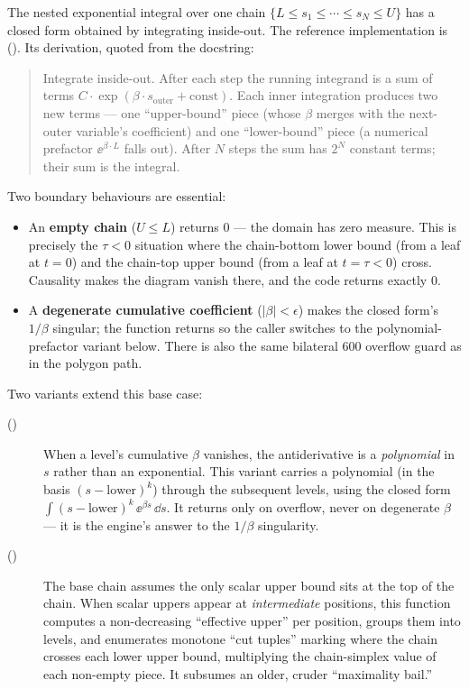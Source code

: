 The nested exponential integral over one chain
$\{L\le s_1\le\cdots\le s_N\le U\}$ has a closed form obtained by integrating
inside-out. The reference implementation is 
(). Its derivation, quoted from the docstring:

\begin{quote}\small
Integrate inside-out. After each step the running integrand is a sum of terms
$C\cdot\exp(\beta\cdot s_{\text{outer}} + \text{const})$. Each inner integration
produces two new terms --- one ``upper-bound'' piece (whose $\beta$ merges with the
next-outer variable's coefficient) and one ``lower-bound'' piece (a numerical
prefactor $\ee^{\beta\cdot L}$ falls out). After $N$ steps the sum has $2^N$
constant terms; their sum is the integral.
\end{quote}

\noindent Two boundary behaviours are essential:

\begin{itemize}
  \item An \textbf{empty chain} ($U \le L$) returns $0$ --- the domain has zero
        measure. This is precisely the $\tau < 0$ situation where the chain-bottom
        lower bound (from a leaf at $t=0$) and the chain-top upper bound (from a
        leaf at $t=\tau<0$) cross. Causality makes the diagram vanish there, and
        the code returns exactly $0$.
  \item A \textbf{degenerate cumulative coefficient} ($|\beta| < \epsilon$) makes
        the closed form's $1/\beta$ singular; the function returns  so
        the caller switches to the polynomial-prefactor variant below. There is
        also the same bilateral $600$ overflow guard as in the polygon path.
\end{itemize}

Two variants extend this base case:

\begin{description}
  \item[
        ()] When a level's cumulative $\beta$
        vanishes, the antiderivative is a \emph{polynomial} in $s$ rather than an
        exponential. This variant carries a polynomial (in the basis
        $(s-\text{lower})^k$) through the subsequent levels, using the closed form
        $\int (s-\text{lower})^k\,\ee^{\beta s}\,\dd s$. It returns 
        only on overflow, never on degenerate $\beta$ --- it is the engine's answer
        to the $1/\beta$ singularity.
  \item[
        ()] The base chain assumes the only scalar
        upper bound sits at the top of the chain. When scalar uppers appear at
        \emph{intermediate} positions, this function computes a non-decreasing
        ``effective upper'' per position, groups them into levels, and enumerates
        monotone ``cut tuples'' marking where the chain crosses each lower upper
        bound, multiplying the chain-simplex value of each non-empty piece. It
        subsumes an older, cruder ``maximality bail.''
\end{description}


